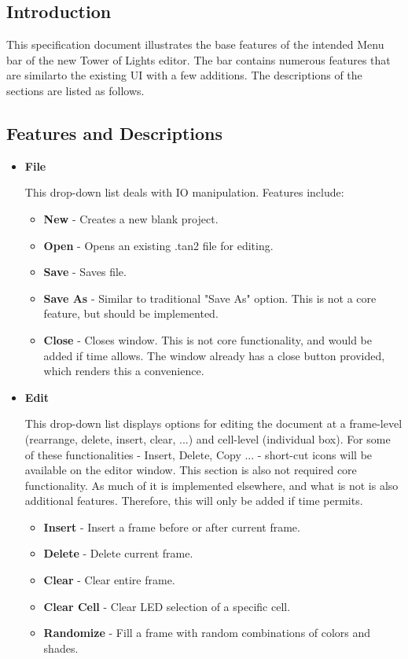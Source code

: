 \documentclass[12pt]{extarticle}
\begin{document}
\subsection{Introduction}

{This specification document illustrates the base features of the intended Menu bar of the new Tower of Lights editor. The bar contains numerous features that are similarto the existing UI with a few additions. The descriptions of the sections are listed as follows.}

\subsection{Features and Descriptions}

\begin{itemize}
\item \textbf{File}

{This drop-down list deals with IO manipulation. Features include:}

	\begin{itemize}
	\item \textbf{New} - Creates a new blank project. 
	\item \textbf{Open} - Opens an existing .tan2 file for editing.
	\item \textbf{Save} - Saves file.
	\item \textbf{Save As} - Similar to traditional "Save As" option.  This is not a core feature, but should be implemented.
	\item \textbf{Close} - Closes window.   This is not core functionality, and would be added if time allows.  The window already has a close button provided, which renders this a convenience.


	\end{itemize}

\item \textbf{Edit}

{This drop-down list displays options for editing the document at a frame-level (rearrange, delete, insert, clear, ...) and cell-level (individual box). For some of these functionalities - Insert, Delete, Copy ... - short-cut icons will be available on the editor window.  This section is also not required core functionality.  As much of it is implemented elsewhere, and what is not is also additional features.  Therefore, this will only be added if time permits.}

	\begin{itemize}
	\item \textbf{Insert} - Insert a frame before or after current frame.
	\item \textbf{Delete} - Delete current frame.
	\item \textbf{Clear} - Clear entire frame.
	\item \textbf{Clear Cell} - Clear LED selection of a specific cell.
	\item \textbf{Randomize} - Fill a frame with random combinations of colors and shades.
	\end{itemize}


\end{itemize}
\end{document}
